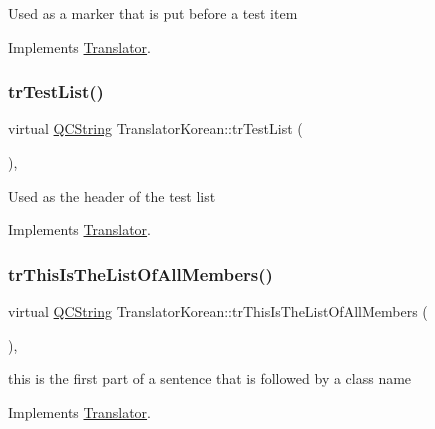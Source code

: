 Used as a marker that is put before a test item 

Implements \mbox{\hyperlink{class_translator}{Translator}}.

\mbox{\label{class_translator_korean_aed1f9bd363efefee64aba4fcac1e76ff}} 
\subsubsection{\texorpdfstring{trTestList()}{trTestList()}}
{\footnotesize\ttfamily virtual \mbox{\hyperlink{class_q_c_string}{Q\+C\+String}} Translator\+Korean\+::tr\+Test\+List (\begin{DoxyParamCaption}{ }\end{DoxyParamCaption})\hspace{0.3cm}{\ttfamily [inline]}, {\ttfamily [virtual]}}

Used as the header of the test list 

Implements \mbox{\hyperlink{class_translator}{Translator}}.

\mbox{\label{class_translator_korean_aaf0b580274be3dbd8ef9450b59eaf66d}} 
\subsubsection{\texorpdfstring{trThisIsTheListOfAllMembers()}{trThisIsTheListOfAllMembers()}}
{\footnotesize\ttfamily virtual \mbox{\hyperlink{class_q_c_string}{Q\+C\+String}} Translator\+Korean\+::tr\+This\+Is\+The\+List\+Of\+All\+Members (\begin{DoxyParamCaption}{ }\end{DoxyParamCaption})\hspace{0.3cm}{\ttfamily [inline]}, {\ttfamily [virtual]}}

this is the first part of a sentence that is followed by a class name 

Implements \mbox{\hyperlink{class_translator}{Translator}}.

\mbox{\label{class_translator_korean_af182c1ab673fce1be5dd85c1f3b522f4}} 

